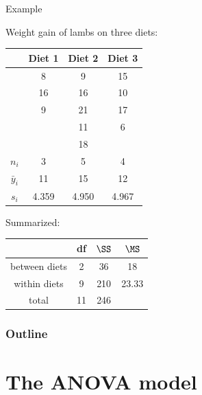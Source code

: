 \begin{frame}{Example}

    Weight gain of lambs on three diets:
    \begin{center}
        \begin{tabular}{cccc}
            & Diet 1 & Diet 2 & Diet 3 \\
            \hline
            & 8 & 9 & 15 \\
            & 16 & 16 & 10 \\
            & 9 & 21 & 17 \\
            &  & 11 & 6 \\
            &  & 18 &  \\
            \hline
            $n_i$ & 3 & 5 & 4 \\
            $\bar y_i$ & 11 & 15 & 12 \\
            $s_i$ & 4.359 & 4.950 & 4.967 \\
        \end{tabular}
    \end{center}

    \vspace{2em}

    Summarized:
    \begin{center}
        \begin{tabular}{cccc}
            & df & $\SS$ & $\MS$ \\
            \hline
            between diets & 2 & 36 & 18 \\
            within diets & 9 & 210 & 23.33 \\
            \hline
            total & 11 & 246 & \\
        \end{tabular}
    \end{center}

\end{frame}

\begin{frame}\frametitle<presentation>{Outline}
  \tableofcontents
\end{frame}

\section{The ANOVA model}


